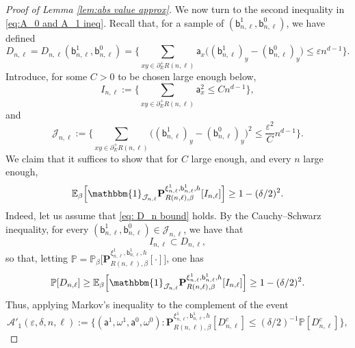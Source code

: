 \documentclass[11pt,a4paper]{article}
\numberwithin{equation}{section}
\theoremstyle{plain}
\theoremstyle{definition}
\begin{document}
\begin{proof}[Proof of Lemma \textup{\ref{lem:abs value approx}}]
We now turn to the second inequality in \eqref{eq:A_0 and A_1 ineq}. Recall that, for a sample of $(\mathsf{b}_{n,\ell}^1,\mathsf{b}_{n,\ell}^0)$, we have defined
\begin{equation}
    D_{n,\ell} =  D_{n,\ell}(\mathsf{b}_{n,\ell}^1,\mathsf{b}_{n,\ell}^0)= \Big\{ \sum_{xy \in \partial^{+}_E R(n,\ell)} \mathsf a_x \Big((\mathsf b^1_{n,\ell})_y - (\mathsf b^0_{n,\ell})_y\Big)\leq \varepsilon n^{d-1}\Big\}.
\end{equation}
Introduce, for some $C>0$ to be chosen large enough below,
\begin{equation}
I_{n,\ell}:=\Big\{\sum_{xy\in \partial^+_E R(n,\ell)} \mathsf{a}_x^2\leq Cn^{d-1}\Big\},
\end{equation}
and
\begin{equation}
\mathcal J_{n,\ell}:=\Big\{\sum_{xy\in \partial^+_E R(n,\ell)}\Big((\mathsf b^1_{n,\ell})_y - (\mathsf b^0_{n,\ell})_y\Big)^2\leq \frac{\varepsilon^2}{C}n^{d-1} \Big\}.
\end{equation}
We claim that it suffices to show that for $C$ large enough, and every $n$ large enough,
\begin{equation}\label{eq: D_n bound}
   \mathbb E_\beta\Bigl[ \mathbbm{1}_{\mathcal{J}_{n,\ell}} \mathbf P^{\xi^1_{n,\ell}, \mathsf b^1_{n,\ell},h}_{R(n,\ell),\beta}[I_{n,\ell}]\Bigr]\geq 1-(\delta/2)^2.
\end{equation}
Indeed, let us assume that \eqref{eq: D_n bound} holds. By the Cauchy--Schwarz inequality, for every $(\mathsf b^1_{n,\ell},\mathsf b^0_{n,\ell}) \in \mathcal J_{n,\ell}$, we have that 
\begin{equation}
    I_{n,\ell} \subset D_{n,\ell},
\end{equation}
so that, letting $\mathbb P = \mathbb P_\beta\big[\mathbf P^{\xi^1_{n,\ell}, \mathsf b^1_{n,\ell}, h}_{R(n,\ell),\beta}[\cdot]\big]$, one has
\begin{equation}
\mathbb P[D_{n,\ell}]\geq \mathbb E_\beta\Bigl[ \mathbbm{1}_{\mathcal{J}_{n,\ell}} \mathbf P^{\xi^1_{n,\ell}, \mathsf b^1_{n,\ell},h}_{R(n,\ell),\beta}[I_{n,\ell}]\Bigr]\geq 1-(\delta/2)^2.
\end{equation}
Thus, applying Markov's inequality to the complement of the event 
\begin{equation}
\mathcal A'_1(\varepsilon,\delta,n,\ell):= \Big\{ (\mathsf a^1, \omega^1,  \mathsf a^0, \omega^0) : \mathbf P^{\xi^1_{n,\ell}, \mathsf b^1_{n,\ell},h}_{R(n,\ell), \beta}[D^c_{n,\ell}]\leq (\delta/2)^{-1} \mathbb{P}[D^c_{n,\ell}] \Big\}, 
\end{equation}

\end{proof}
\end{document}
